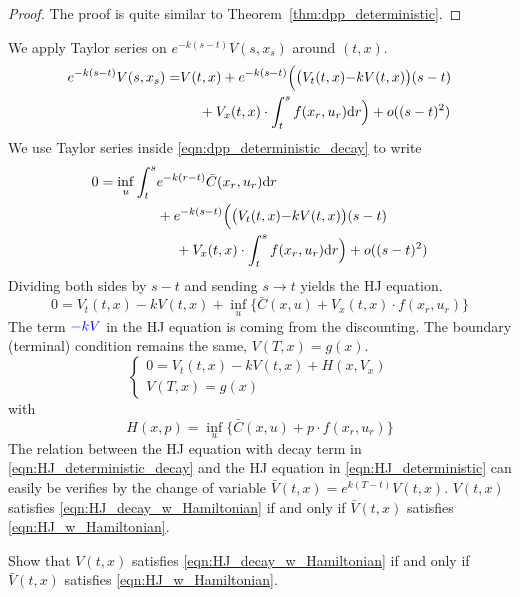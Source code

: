 \documentclass[11pt]{book}
\newcommand{\dr}{\text{\normalfont d}r}
\begin{document}
\begin{proof}
    The proof is quite similar to Theorem~\ref{thm:dpp_deterministic}.
\end{proof}
    We apply Taylor series on $e^{-k(s-t)}V(s,x_s)$ around $(t,x)$.
    \[
        \begin{split}
             {e^{-k(s-t)}}V(s,x_s) = &V(t,x) + {e^{-k(s-t)}}\Big(\big(V_t(t,x) {- k V(t,x)}\big)(s-t)\\
             &~~~~+ V_x(t,x)\cdot\int_t^s f(x_r,u_r)\dr\Big) + o((s-t)^2)
        \end{split}
        \]
       We use Taylor series inside \eqref{eqn:dpp_deterministic_decay} to write
        \[
        \begin{split}
            0=\inf_{u}\int_t^s &{e^{-k(r-t)}}\bar{C}(x_r,u_r)\dr \\
            &+  {e^{-k(s-t)}}\Big(\big(V_t(t,x) {- k V(t,x)}\big)(s-t)\\
             &~~~~+ V_x(t,x)\cdot\int_t^s f(x_r,u_r)\dr\Big) + o((s-t)^2)
        \end{split}
        \]
        Dividing both sides by $s-t$ and sending $s\to t$ yields the HJ equation.
        \begin{equation}
            \label{eqn:HJ_deterministic_decay}
            0=V_t(t,x) - k V(t,x)+\inf_{u}\Big\{\bar{C}(x,u) + V_x(t,x)\cdot f(x_r,u_r)\Big\}
        \end{equation}
        The term ${\color{blue}-kV}$ in the HJ equation is coming from the discounting. 
        The boundary (terminal) condition remains the same, $V(T,x)=g(x)$. 
        \begin{equation}
        \label{eqn:HJ_decay_w_Hamiltonian}
            \begin{cases}
                0=V_t(t,x) - k V(t,x)+H(x,V_x)\\
                V(T,x)=g(x)
            \end{cases}
        \end{equation}
        with
        \[
        H(x,p)=\inf_{u}\Big\{\bar{C}(x,u) + p\cdot f(x_r,u_r)\Big\}
        \]
        The relation between the HJ equation with decay term in \eqref{eqn:HJ_deterministic_decay} and the HJ equation in \eqref{eqn:HJ_deterministic} can easily be verifies by the change of variable $\bar{V}(t,x)=e^{k(T-t)}V(t,x)$. $V(t,x)$ satisfies \eqref{eqn:HJ_decay_w_Hamiltonian} if and only if $\bar{V}(t,x)$ satisfies \eqref{eqn:HJ_w_Hamiltonian}. 
        \begin{ex}
            Show that $V(t,x)$ satisfies \eqref{eqn:HJ_decay_w_Hamiltonian} if and only if $\bar{V}(t,x)$ satisfies \eqref{eqn:HJ_w_Hamiltonian}. 
        \end{ex}
    
\end{document}
